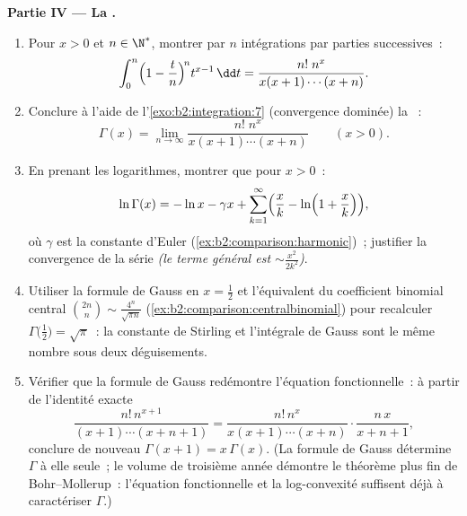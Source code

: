 \begin{problem}
\medskip
\noindent\textbf{Partie IV --- La .}
\begin{enumerate}[resume]
  \item Pour $x > 0$ et $n \in \N^*$, montrer par $n$ intégrations
        par parties successives~:
        \[
        \int_0^n \Bigl(1 - \frac tn\Bigr)^{\!n} t^{x-1}\,\dd t
        = \frac{n!\;n^x}{x(x+1)\cdots(x+n)} .
        \]
  \item Conclure à l'aide de l'\cref{exo:b2:integration:7} (convergence
        dominée) la \emph{}~:
        \[
        \Gamma(x) = \lim_{n\to\infty}
        \frac{n!\;n^x}{x(x+1)\cdots(x+n)}
        \qquad (x > 0).
        \]
  \item En prenant les logarithmes, montrer que pour $x > 0$~:
        \[
        \ln\Gamma(x) = -\ln x - \gamma x +
        \sum_{k=1}^{\infty}\Bigl(\frac xk -
        \ln\Bigl(1 + \frac xk\Bigr)\Bigr),
        \]
        où $\gamma$ est la constante d'Euler
        (\cref{ex:b2:comparison:harmonic})~; justifier la
        convergence de la série \emph{(le terme général est
        $\sim \frac{x^2}{2k^2}$)}.
  \item Utiliser la formule de Gauss en $x = \frac12$ et l'équivalent du
        coefficient binomial central $\binom{2n}{n} \sim
        \frac{4^n}{\sqrt{\pi n}}$
        (\cref{ex:b2:comparison:centralbinomial}) pour recalculer
        $\Gamma\bigl(\frac12\bigr) = \sqrt\pi$~: la constante de
        Stirling et l'intégrale de Gauss sont le même nombre
        sous deux déguisements.
  \item Vérifier que la formule de Gauss redémontre l'équation
        fonctionnelle~: à partir de l'identité exacte
        \[
        \frac{n!\,n^{x+1}}{(x+1)\cdots(x+n+1)}
        = \frac{n!\,n^{x}}{x(x+1)\cdots(x+n)}\cdot
        \frac{n\,x}{x+n+1},
        \]
        conclure de nouveau $\Gamma(x+1) = x\,\Gamma(x)$. (La formule de Gauss
        détermine $\Gamma$ à elle seule~; le volume de troisième année
        démontre le théorème plus fin de Bohr--Mollerup~: l'équation
        fonctionnelle et la log-convexité suffisent déjà à caractériser
        $\Gamma$.)
\end{enumerate}


\end{problem}
